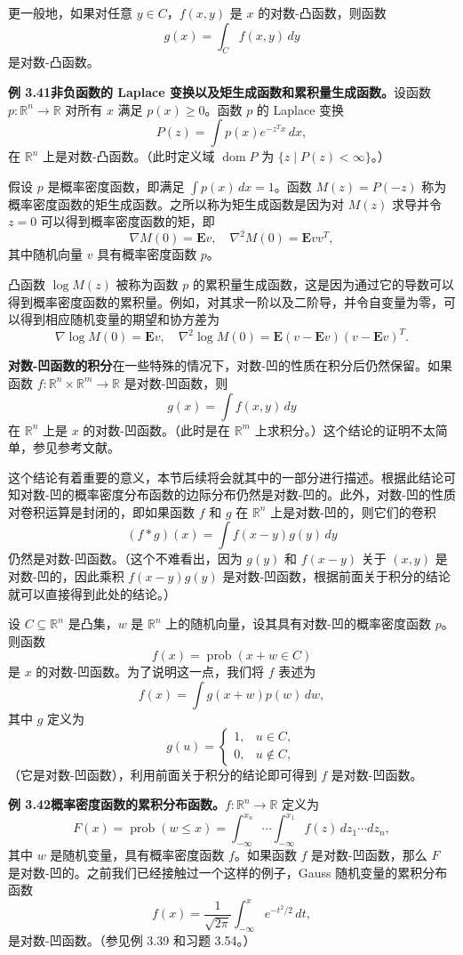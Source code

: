 \documentclass[UTF8,12pt,a4paper,fontset=fandol]{ctexart}
\DeclareMathOperator{\dom}{dom}
\begin{document}
更一般地，如果对任意 $y\in C$，$f(x,y)$ 是 $x$ 的对数-凸函数，则函数
\[
g(x)=\int_C f(x,y)\,dy
\]
是对数-凸函数。

\noindent\textbf{例 3.41\quad 非负函数的 Laplace 变换以及矩生成函数和累积量生成函数。}\quad 设函数 $p:\mathbb{R}^n\to\mathbb{R}$ 对所有 $x$ 满足 $p(x)\geq0$。函数 $p$ 的 Laplace 变换
\[
P(z)=\int p(x)e^{-z^Tx}\,dx,
\]
在 $\mathbb{R}^n$ 上是对数-凸函数。（此时定义域 $\dom P$ 为 $\{z\mid P(z)<\infty\}$。）

假设 $p$ 是概率密度函数，即满足 $\int p(x)\,dx=1$。函数 $M(z)=P(-z)$ 称为概率密度函数的矩生成函数。之所以称为矩生成函数是因为对 $M(z)$ 求导并令 $z=0$ 可以得到概率密度函数的矩，即
\[
\nabla M(0)=\mathbf{E}v,\quad
\nabla^2M(0)=\mathbf{E}vv^T,
\]
其中随机向量 $v$ 具有概率密度函数 $p$。

凸函数 $\log M(z)$ 被称为函数 $p$ 的累积量生成函数，这是因为通过它的导数可以得到概率密度函数的累积量。例如，对其求一阶以及二阶导，并令自变量为零，可以得到相应随机变量的期望和协方差为
\[
\nabla\log M(0)=\mathbf{E}v,\quad
\nabla^2\log M(0)=\mathbf{E}(v-\mathbf{E}v)(v-\mathbf{E}v)^T.
\]

\noindent\textbf{对数-凹函数的积分}\quad 在一些特殊的情况下，对数-凹的性质在积分后仍然保留。如果函数 $f:\mathbb{R}^n\times\mathbb{R}^m\to\mathbb{R}$ 是对数-凹函数，则
\[
g(x)=\int f(x,y)\,dy
\]
在 $\mathbb{R}^n$ 上是 $x$ 的对数-凹函数。（此时是在 $\mathbb{R}^m$ 上求积分。）这个结论的证明不太简单，参见参考文献。

这个结论有着重要的意义，本节后续将会就其中的一部分进行描述。根据此结论可知对数-凹的概率密度分布函数的边际分布仍然是对数-凹的。此外，对数-凹的性质对卷积运算是封闭的，即如果函数 $f$ 和 $g$ 在 $\mathbb{R}^n$ 上是对数-凹的，则它们的卷积
\[
(f*g)(x)=\int f(x-y)g(y)\,dy
\]
仍然是对数-凹函数。（这个不难看出，因为 $g(y)$ 和 $f(x-y)$ 关于 $(x,y)$ 是对数-凹的，因此乘积 $f(x-y)g(y)$ 是对数-凹函数，根据前面关于积分的结论就可以直接得到此处的结论。）

设 $C\subseteq\mathbb{R}^n$ 是凸集，$w$ 是 $\mathbb{R}^n$ 上的随机向量，设其具有对数-凹的概率密度函数 $p$。则函数
\[
f(x)=\operatorname{prob}(x+w\in C)
\]
是 $x$ 的对数-凹函数。为了说明这一点，我们将 $f$ 表述为
\[
f(x)=\int g(x+w)p(w)\,dw,
\]
其中 $g$ 定义为
\[
g(u)=
\begin{cases}
1, & u\in C,\\
0, & u\notin C,
\end{cases}
\]
（它是对数-凹函数），利用前面关于积分的结论即可得到 $f$ 是对数-凹函数。

\noindent\textbf{例 3.42\quad 概率密度函数的累积分布函数。}\quad $f:\mathbb{R}^n\to\mathbb{R}$ 定义为
\[
F(x)=\operatorname{prob}(w\leq x)=\int_{-\infty}^{x_n}\cdots\int_{-\infty}^{x_1} f(z)\,dz_1\cdots dz_n,
\]
其中 $w$ 是随机变量，具有概率密度函数 $f$。如果函数 $f$ 是对数-凹函数，那么 $F$ 是对数-凹的。之前我们已经接触过一个这样的例子，Gauss 随机变量的累积分布函数
\[
f(x)=\frac{1}{\sqrt{2\pi}}\int_{-\infty}^{x}e^{-t^2/2}\,dt,
\]
是对数-凹函数。（参见例 3.39 和习题 3.54。）
\end{document}
